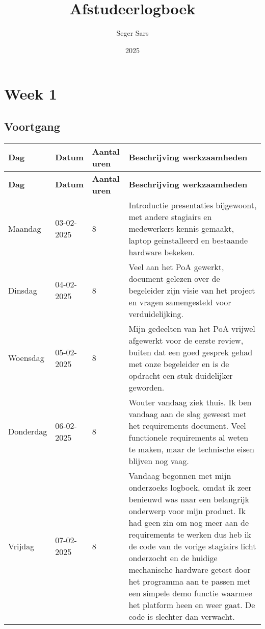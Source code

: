 \documentclass[a4paper,12pt]{article}
\title{Afstudeerlogboek}
\author{Seger Sars}
\date{2025}
\begin{document}
\maketitle

\newpage

\section*{Week 1}

\subsection*{Voortgang}
\begin{longtable}{|l|l|p{}|p{}|}
\hline
\textbf{Dag} & \textbf{Datum} & \textbf{Aantal uren} & \textbf{Beschrijving werkzaamheden} \\
\hline
\endfirsthead
\hline
\textbf{Dag} & \textbf{Datum} & \textbf{Aantal uren} & \textbf{Beschrijving werkzaamheden} \\
\hline
\endhead
\hline
\endfoot
\endlastfoot
Maandag   & 03-02-2025 & 8 & Introductie presentaties bijgewoont, met andere stagiairs en medewerkers kennis gemaakt, laptop geinstalleerd en bestaande hardware bekeken. \\ \hline
Dinsdag   & 04-02-2025 & 8 & Veel aan het PoA gewerkt, document gelezen over de begeleider zijn visie van het project en vragen samengesteld voor verduidelijking. \\ \hline
Woensdag  & 05-02-2025 & 8 & Mijn gedeelten van het PoA vrijwel afgewerkt voor de eerste review, buiten dat een goed gesprek gehad met onze begeleider en is de opdracht een stuk duidelijker geworden. \\ \hline
Donderdag & 06-02-2025 & 8 & Wouter vandaag ziek thuis. Ik ben vandaag aan de slag geweest met het requirements document. Veel functionele requirements al weten te maken, maar de technische eisen blijven nog vaag. \\ \hline
Vrijdag   & 07-02-2025 & 8 & Vandaag begonnen met mijn onderzoeks logboek, omdat ik zeer benieuwd was naar een belangrijk onderwerp voor mijn product. Ik had geen zin om nog meer aan de requirements te werken dus heb ik de code van de vorige stagiairs licht onderzocht en de huidige mechanische hardware getest door het programma aan te passen met een simpele demo functie waarmee het platform heen en weer gaat. De code is slechter dan verwacht. \\ \hline

\hline

\end{longtable}
\end{document}
